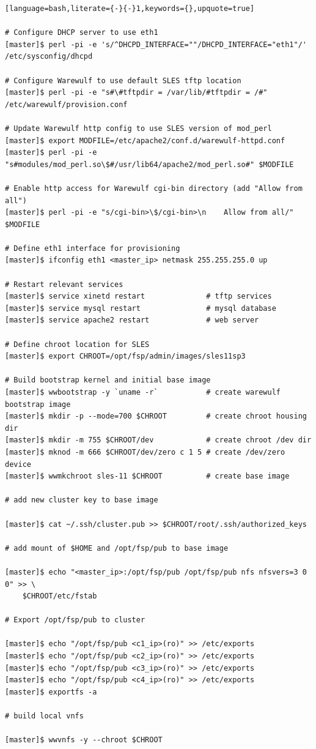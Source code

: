 \documentclass[letterpaper]{article}
\begin{document}
\vspace*{0.2cm}


\begin{lstlisting}[language=bash,literate={-}{-}1,keywords={},upquote=true]

# Configure DHCP server to use eth1
[master]$ perl -pi -e 's/^DHCPD_INTERFACE=""/DHCPD_INTERFACE="eth1"/' /etc/sysconfig/dhcpd

# Configure Warewulf to use default SLES tftp location
[master]$ perl -pi -e "s#\#tftpdir = /var/lib/#tftpdir = /#" /etc/warewulf/provision.conf

# Update Warewulf http config to use SLES version of mod_perl
[master]$ export MODFILE=/etc/apache2/conf.d/warewulf-httpd.conf
[master]$ perl -pi -e "s#modules/mod_perl.so\$#/usr/lib64/apache2/mod_perl.so#" $MODFILE

# Enable http access for Warewulf cgi-bin directory (add "Allow from all")
[master]$ perl -pi -e "s/cgi-bin>\$/cgi-bin>\n    Allow from all/" $MODFILE

# Define eth1 interface for provisioning
[master]$ ifconfig eth1 <master_ip> netmask 255.255.255.0 up

# Restart relevant services
[master]$ service xinetd restart              # tftp services
[master]$ service mysql restart               # mysql database
[master]$ service apache2 restart             # web server

# Define chroot location for SLES 
[master]$ export CHROOT=/opt/fsp/admin/images/sles11sp3

# Build bootstrap kernel and initial base image
[master]$ wwbootstrap -y `uname -r`           # create warewulf bootstrap image
[master]$ mkdir -p --mode=700 $CHROOT         # create chroot housing dir
[master]$ mkdir -m 755 $CHROOT/dev            # create chroot /dev dir
[master]$ mknod -m 666 $CHROOT/dev/zero c 1 5 # create /dev/zero device
[master]$ wwmkchroot sles-11 $CHROOT          # create base image

# add new cluster key to base image

[master]$ cat ~/.ssh/cluster.pub >> $CHROOT/root/.ssh/authorized_keys

# add mount of $HOME and /opt/fsp/pub to base image

[master]$ echo "<master_ip>:/opt/fsp/pub /opt/fsp/pub nfs nfsvers=3 0 0" >> \
    $CHROOT/etc/fstab

# Export /opt/fsp/pub to cluster

[master]$ echo "/opt/fsp/pub <c1_ip>(ro)" >> /etc/exports
[master]$ echo "/opt/fsp/pub <c2_ip>(ro)" >> /etc/exports
[master]$ echo "/opt/fsp/pub <c3_ip>(ro)" >> /etc/exports
[master]$ echo "/opt/fsp/pub <c4_ip>(ro)" >> /etc/exports
[master]$ exportfs -a

# build local vnfs 

[master]$ wwvnfs -y --chroot $CHROOT

\end{lstlisting}
\end{document}
